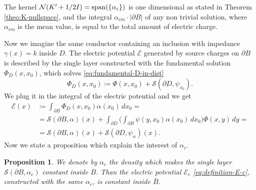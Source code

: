 \documentclass[10pt, a4paper, twoside, openright]{book}
\theoremstyle{definition}
\theoremstyle{plain}
\theoremstyle{plain}
\theoremstyle{plain}
\newtheorem{proposition}[subsection]{Proposition}
\theoremstyle{plain}
\theoremstyle{plain}
\theoremstyle{plain}
\theoremstyle{plain}
\theoremstyle{plain}
\begin{document}
The kernel $\mathcal{N}(K' + 1/2 I)=\textup{span}(\{\alpha_{c}\})$ is one dimensional as stated in Theorem \ref{theo:K-nullspace}, and the integral $\alpha_{cm} \cdot|\partial B|$ of any non trivial solution, where $\alpha_{cm}$ is the mean value, is equal to the total amount of electric charge.
\par
Now we imagine the same conductor containing an inclusion with impedance $\gamma(x)=k$ inside $D$. The electric potential $\mathcal{E}$ generated by source charges on $\partial B$ is described by the single layer constructed with the fundamental solution $\Phi_D(x,x_0)$, which solves \eqref{eq:fundamental-D-in-dist}
\begin{equation}
 \Phi_D(x,x_0)\coloneqq\Phi(x,x_0)+\mathcal{S}(\partial D,\psi_{x_0}).\label{eq:decomposition-Phi-D}
\end{equation}
We plug it in the integral of the electric potential and we get
\begin{align}
 \mathcal{E}(x)&\coloneqq\int_{\partial B}\Phi_D(x,x_0)\alpha(x_0)\,dx_0= \label{eq:definition-E-c}\\
  &=\mathcal{S}(\partial B, \alpha)(x) + \int_{\partial D} \Big(\int_{\partial B}\psi(y,x_0)\alpha(x_0)\,dx_0\Big)\Phi(x,y)\,dy = \\
  &=\mathcal{S}(\partial B, \alpha)(x) + \mathcal{S}(\partial D, \psi_{\alpha})(x). \label{eq:decomposition-E-c}
\end{align}
Now we state a proposition which explain the interest of $\alpha_{c}$.
\begin{proposition}
\label{prop:alpha_c-both-problems}
 We denote by $\alpha_{c}$ the density which makes the single layer $\mathcal{S}(\partial B, \alpha_{c})$ constant inside $\overline{B}$.
 Than the electric potential $\mathcal{E}_{c}$ \eqref{eq:definition-E-c}, constructed with the same $\alpha_{c}$, is constant inside $\overline{B}$.
\end{proposition}
\end{document}
